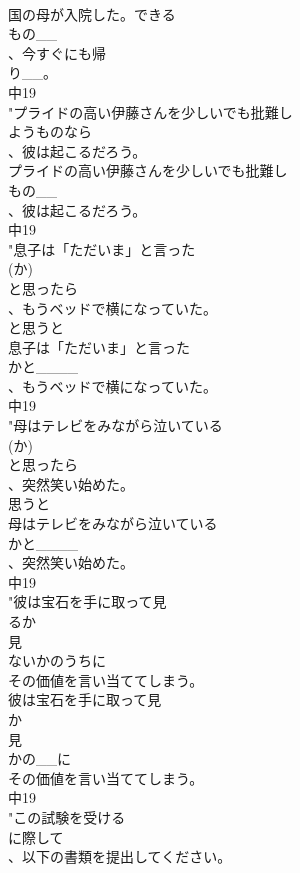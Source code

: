 \documentclass[8pt]{extreport}
\begin{document}
\begin{CJK}{UTF8}{min}
\\	国の母が入院した。できる
\\	もの__
\\	、今すぐにも帰
\\	り__。
\\	中19
\\	"プライドの高い伊藤さんを少しいでも批難し
\\	ようものなら
\\	、彼は起こるだろう。
\\	プライドの高い伊藤さんを少しいでも批難し
\\	もの__
\\	、彼は起こるだろう。
\\	中19
\\	"息子は「ただいま」と言った
\\	(か)
\\	と思ったら
\\	、もうベッドで横になっていた。
\\	と思うと
\\	息子は「ただいま」と言った
\\	かと____
\\	、もうベッドで横になっていた。
\\	中19
\\	"母はテレビをみながら泣いている
\\	(か)
\\	と思ったら
\\	、突然笑い始めた。 
\\	思うと
\\	母はテレビをみながら泣いている
\\	かと____
\\	、突然笑い始めた。
\\	中19
\\	"彼は宝石を手に取って見
\\	るか
\\	見
\\	ないかのうちに
\\	その価値を言い当ててしまう。
\\	彼は宝石を手に取って見
\\	か
\\	見
\\	かの__に
\\	その価値を言い当ててしまう。
\\	中19
\\	"この試験を受ける
\\	に際して
\\	、以下の書類を提出してください。

\end{CJK}
\end{document}

